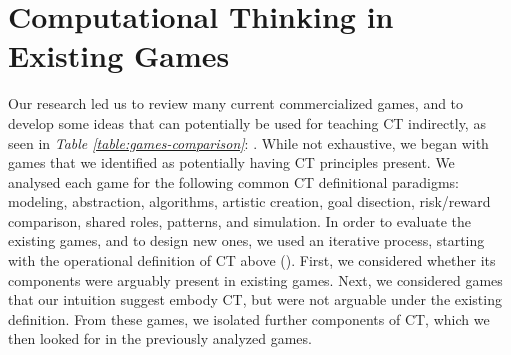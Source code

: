 \documentclass{acm_proc_article-sp}
\begin{document}


\section{Computational Thinking in Existing Games}
\label{sec:CT_current_games}
Our research led us to review many current commercialized games, and to develop some ideas that can potentially be used for teaching CT indirectly, as seen in \textit{Table \ref{table:games-comparison}}: \textit{}.
While not exhaustive, we began with games that we identified as potentially having CT principles present.
We analysed each game for the following common CT definitional paradigms: modeling, abstraction, algorithms, artistic creation, goal disection, risk/reward comparison, shared roles, patterns, and simulation.
In order to evaluate the existing games, and to design new ones, we used an iterative process, starting with the operational definition of CT above (\cite{operationalct}).
First, we considered whether its components were arguably present in existing games.
Next, we considered games that our intuition suggest embody CT, but were not arguable under the existing definition.
From these games, we isolated further components of CT, which we then looked for in the previously analyzed games.
\end{document}
